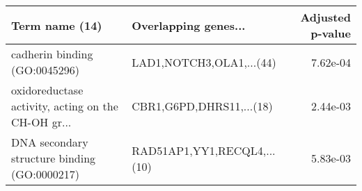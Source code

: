 \begin{tabular}{llr}
\toprule
                                    Term name (14) &        Overlapping genes... &  Adjusted p-value \\
\midrule
                     cadherin binding (GO:0045296) &    LAD1,NOTCH3,OLA1,...(44) &          7.62e-04 \\
oxidoreductase activity, acting on the CH-OH gr... &    CBR1,G6PD,DHRS11,...(18) &          2.44e-03 \\
      DNA secondary structure binding (GO:0000217) & RAD51AP1,YY1,RECQL4,...(10) &          5.83e-03 \\
\bottomrule
\end{tabular}

